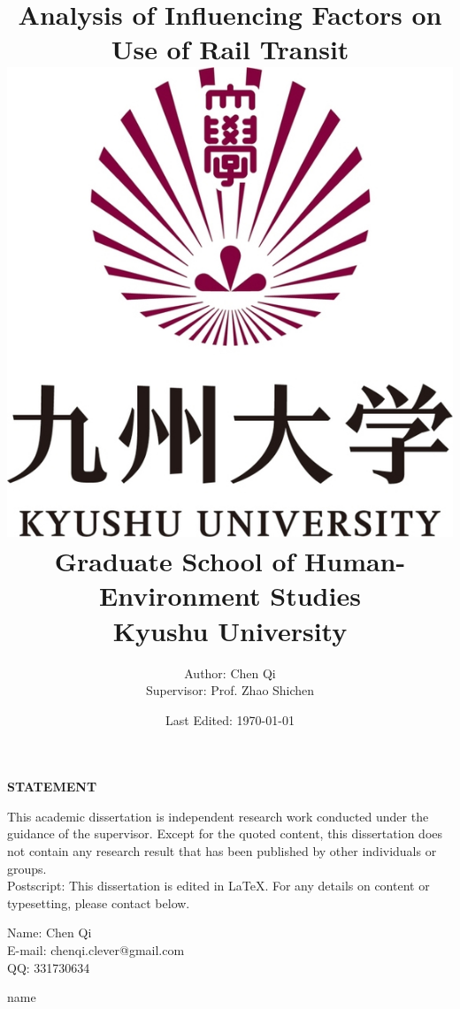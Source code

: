 \documentclass[12pt, twoside, a4paper]{book} %
\renewcommand{\baselinestretch}{1.5} %
\begin{document}
\title{
	{\Huge Analysis of Influencing Factors on Use of Rail Transit}\\
	{\vspace{3cm}}
	{\includegraphics[width=0.2\linewidth]{university.jpg}}\\
	{\vspace{2cm}}
	{\large Graduate School of Human-Environment Studies}\\
	{\large Kyushu University}
}
\author{
	{\large Author: Chen Qi}\\
	{\large Supervisor: Prof. Zhao Shichen}
	{\vspace{1cm}}
}
\date{\normalsize Last Edited: \today}
\maketitle

\centerline{\textbf{\Large STATEMENT}}
%
This academic dissertation is independent research work conducted under the guidance of the supervisor. Except for the quoted content, this dissertation does not contain any research result that has been published by other individuals or groups.\\
\newline
\newline
%
Postscript:
%
This dissertation is edited in \LaTeX. For any details on content or typesetting, please contact below.

\begin{flushright}
	Name: Chen Qi \\
	E-mail: chenqi.clever@gmail.com \\
	QQ: 331730634 \\
\end{flushright}

\renewcommand{\baselinestretch}{1.2} %
\fontsize{14pt}{14pt} %
\selectfont

\tableofcontents %
\listoffigures %
\listoftables %
\listtablename{name}
\end{document}

